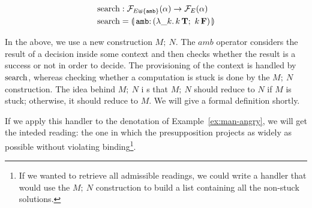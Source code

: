 \begin{align*}
  \search &: \FF_{E \uplus \{\op{amb}\}}(\alpha) \to \FF_E(\alpha) \\
  \search &= \banana{\onto{\op{amb}}{(\lam{\_ k}{\ap{k}{\true};\ \ap{k}{\false}})}}
\end{align*}

In the above, we use a new construction $M;\ N$. The $amb$ operator
considers the result of a decision inside some context and then checks
whether the result is a success or not in order to decide. The provisioning
of the context is handled by $\operatorname{search}$, whereas checking whether a
computation is stuck is done by the $M;\ N$ construction. The idea behind
$M;\ N$ i s that $M;\ N$ should reduce to $N$ if $M$ is stuck; otherwise,
it should reduce to $M$. We will give a formal definition shortly.

If we apply this handler to the denotation of Example~\ref{ex:man-angry},
we will get the inteded reading: the one in which the presupposition
projects as widely as possible without violating binding\footnote{If we
  wanted to retrieve all admissible readings, we could write a handler that
  would use the $M;\ N$ construction to build a list containing all the
  non-stuck solutions.}.

